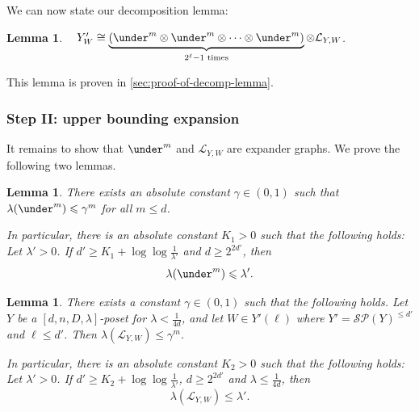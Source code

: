 \documentclass[10pt,a4paper]{article}
\newcommand{\prettyref}[1]{\cref{#1}}
\newtheorem{lemma}[theorem]{Lemma}
\theoremstyle{definition}
\newtheorem{definition}[theorem]{Definition}
\theoremstyle{remark}
\newcommand\sett[2]{\left\{ #1 \left| \; \vphantom{#1 #2} \right. #2  \right\}}
\DeclareMathOperator{\rank}{rank}
\renewcommand{\leq}{\leqslant}
\renewcommand{\geq}{\geqslant}
\numberwithin{equation}{section}
\let\pref=\prettyref
\def\Y{Y}
\def\SL{\mathcal{L}}
\def\diml{d}
\def\dimlin{{\diml}}
\def\dimlout{\diml'}
\def\lambdai{\lambda}
\def\lambdao{\lambda'}
\def\dimm{\ell}
\def\degree{D}
\def\M{\mathcal{SP}}
\def\Stwo{\mathcal{S}}
\begin{document}
We can now state our decomposition lemma:
\begin{lemma}\label{lem:grassmannian-link-decomposition}~
  \(\Y'_W \cong \underbrace{(\under^m \otimes \under^m \otimes \dots \otimes \under^m)}_{2^\dimm -1 \text{ times}} \otimes \SL_{\Y,W}\).
\end{lemma}
This lemma is proven in \pref{sec:proof-of-decomp-lemma}.
%

\subsubsection{Step II: upper bounding expansion}
It remains to show that \(\under^m\) and \(\SL_{\Y,W}\) are expander graphs. We prove the following two lemmas.

\begin{lemma} \label{lem:complete-part-analysis}
There exists an absolute constant \(\gamma \in (0,1)\) such that 
    \(\lambda(\under^m) \leq \gamma^{m}\) for all \(m \leq \dimlin\).
    
    In particular, there is an absolute constant \(K_1 > 0\) such that the following holds: Let \(\lambdao > 0\). If \(\dimlout \geq K_1 + \log \log \frac{1}{\lambdao}\) and \(\dimlin \geq 2^{2 \dimlout}\), then
    \[\lambda(\under^m) \leq \lambdao.\]
\end{lemma}

\begin{lemma} \label{lem:loc-to-glob-decomp-of-link}
There exists a constant \(\gamma  \in (0,1)\) such that the following holds. Let \(\Y\) be a \([\dimlin,n,\degree,\lambdai]\)-poset for \(\lambdai < \frac{1}{4\dimlin}\), and let \(W \in \Y'(\dimm)\) where \(\Y'=\M(Y)^{\leq \dimlout}\) and \(\dimm \leq \dimlout\). Then
    \(\lambda(\SL_{\Y,W}) \leq \gamma^{m}\). %
    
    In particular, there is an absolute constant \(K_2 >0\) such that the following holds: Let \(\lambdao > 0\). If \(\dimlout \geq K_2 + \log \log \frac{1}{\lambdao}\), \(\dimlin \geq 2^{2\dimlout}\) and \(\lambdai \leq \frac{1}{4\dimlin}\), then
    \[\lambda(\SL_{\Y,W}) \leq \lambdao.\]
\end{lemma}
\end{document}
